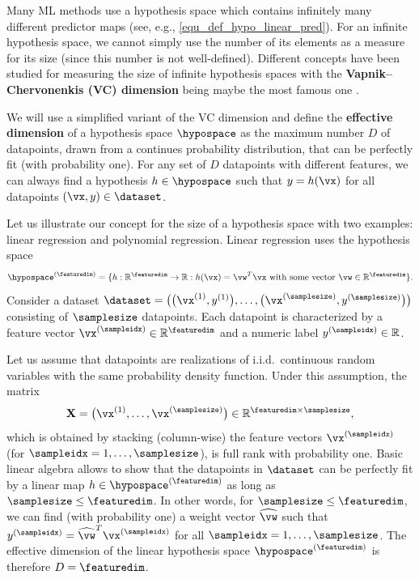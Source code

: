 \documentclass[12pt]{report}
\newcommand{\sizehypospace}{D}
\newcommand{\featurelen}{\featuredim}
\begin{document}
Many ML methods use a hypothesis space which contains 
infinitely many different predictor maps (see, e.g., \eqref{equ_def_hypo_linear_pred}). 
For an infinite hypothesis space, we cannot simply use the 
number of its elements as a measure for its size (since this number 
is not well-defined). Different concepts have been studied for 
measuring the size of infinite hypothesis spaces with the {\bf Vapnik–Chervonenkis (VC) dimension} 
being maybe the most famous one \cite{VapnikBook}. 

We will use a simplified variant of the VC dimension and define the 
{\bf effective dimension} of a hypothesis space $\hypospace$ 
as the maximum number $\sizehypospace$ of datapoints, drawn from 
a continues probability distribution, that can be perfectly fit (with probability one). 
For any set of $\sizehypospace$ datapoints with different features, we 
can always find a hypothesis $h \in \hypospace$ such that $y=h(\vx)$ 
for all datapoints $(\vx,y) \in \dataset$. 

Let us illustrate our concept for the size of a hypothesis space 
with two examples: linear regression and polynomial regression. 
Linear regression uses the hypothesis space 
$$\hypospace^{(\featuredim)} = \{ h: \mathbb{R}^{\featuredim} \rightarrow \mathbb{R}: h(\vx) = \vw^{T} \vx \mbox{ with some vector } \vw \in \mathbb{R}^{\featurelen}\}.$$ 
Consider a dataset $\dataset=\big( \big(\vx^{(1)} ,y^{(1)}\big),\ldots, \big(\vx^{(\samplesize)} ,y^{(\samplesize)}\big) \big)$ consisting of $\samplesize$ datapoints. 
Each datapoint is characterized by a feature 
vector $\vx^{(\sampleidx)} \in \mathbb{R}^{\featuredim}$ and a numeric label 
$y^{(\sampleidx)} \in \mathbb{R}$. 

Let us assume that datapoints are realizations of i.i.d.\ continuous random 
variables with the same probability density function. 
Under this assumption, the matrix 
$$\mathbf{X} = \big(\vx^{(1)},\ldots,\vx^{(\samplesize)}\big) \in \mathbb{R}^{\featuredim\times \samplesize},$$ 
which is obtained by stacking (column-wise) the feature vectors $\vx^{(\sampleidx)}$ (for $\sampleidx=1,\ldots,\samplesize$), 
is full rank with probability one. Basic linear algebra allows to show that 
the datapoints in $\dataset$ can be perfectly fit by a linear map $h \in \hypospace^{(\featuredim)}$ 
as long as $\samplesize \leq \featuredim$. In other words, for  $\samplesize \leq \featuredim$, we 
can find (with probability one) a weight vector $\widehat{\vw}$ such that $y^{(\sampleidx)} = \widehat{\vw}^{T} \vx^{(\sampleidx)}$ 
for all $\sampleidx=1,\ldots,\samplesize$. The effective dimension of the linear hypothesis space 
$\hypospace^{(\featuredim)}$ is therefore $\sizehypospace = \featuredim$. 
\end{document}
